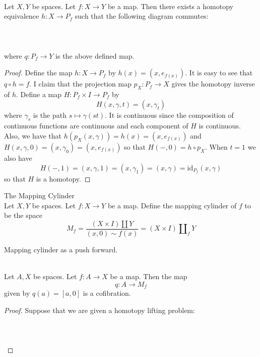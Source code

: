 \documentclass[a4paper]{article}
\begin{document}
\begin{prp}{}{}\\
Let $X,Y$ be spaces. Let $f:X\to Y$ be a map. Then there exists a homotopy equivalence $h:X\to P_f$ such that the following diagram commutes: \\~\\
 \\~\\
where $q:P_f\to Y$ is the above defined map. 
\begin{proof}
Define the map $h:X\to P_f$ by $h(x)=(x,e_{f(x)})$. It is easy to see that $q\circ h=f$. I claim that the projection map $p_X:P_f\to X$ gives the homotopy inverse of $h$. Define a map $H:P_f\times I\to P_f$ by $$H(x,\gamma,t)=(x,\gamma_t)$$ where $\gamma_s$ is the path $s\mapsto\gamma(st)$. It is continuous since the composition of continuous functions are continuous and each component of $H$ is continuous. Also, we have that $h(p_X(x,\gamma))=h(x)=(x,e_{f(x)})$ and $H(x,\gamma,0)=(x,\gamma_0)=(x,e_{f(x)})$ so that $H(-,0)=h\circ p_X$. When $t=1$ we also have $$H(-,1)=(x,\gamma,1)=(x,\gamma_1)=(x,\gamma)=\text{id}_{P_f}(x,\gamma)$$ so that $H$ is a homotopy. 
\end{proof}
\end{prp}

\begin{defn}{The Mapping Cylinder}{}\\
Let $X,Y$ be spaces. Let $f:X\to Y$ be a map. Define the mapping cylinder of $f$ to be the space $$M_f=\frac{(X\times I)\amalg Y}{(x,0)\sim f(x)}=(X\times I)\amalg_fY$$
\end{defn}

Mapping cylinder as a push forward. 

\begin{prp}{}{}\\
Let $A,X$ be spaces. Let $f:A\to X$ be a map. Then the map $$q:A\to M_f$$ given by $q(a)=[a,0]$ is a cofibration. 
\begin{proof}
Suppose that we are given a homotopy lifting problem: \\~\\
\\~\\
\end{proof}
\end{prp}
\end{document}
